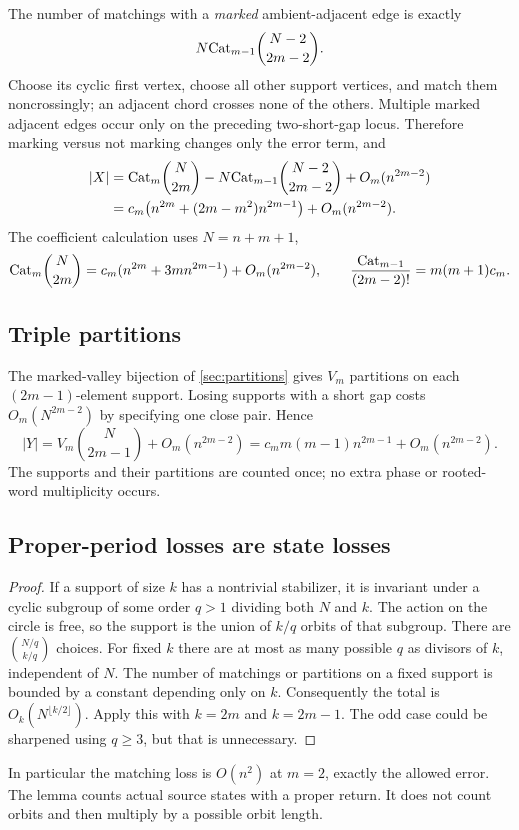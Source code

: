 The number of matchings with a \emph{marked} ambient-adjacent edge is exactly
\[
 N\mathrm{Cat}_{m-1}\binom{N-2}{2m-2}.
\]
Choose its cyclic first vertex, choose all other support vertices, and match them noncrossingly; an adjacent chord crosses none of the others. Multiple marked adjacent edges occur only on the preceding two-short-gap locus. Therefore marking versus not marking changes only the error term, and
\begin{align}
 |X|&=\mathrm{Cat}_m\binom N{2m}-N\mathrm{Cat}_{m-1}\binom{N-2}{2m-2}
       +O_m(n^{2m-2})\notag\\
 &=c_m\bigl(n^{2m}+(2m-m^2)n^{2m-1}\bigr)+O_m(n^{2m-2}).\label{eq:X-count}
\end{align}
The coefficient calculation uses $N=n+m+1$,
\[
 \mathrm{Cat}_m\binom N{2m}=c_m(n^{2m}+3mn^{2m-1})+O_m(n^{2m-2}),
 \qquad \frac{\mathrm{Cat}_{m-1}}{(2m-2)!}=m(m+1)c_m.
\]

\subsection{Triple partitions}
The marked-valley bijection of \cref{sec:partitions} gives $V_m$ partitions on each $(2m-1)$-element support. Losing supports with a short gap costs $O_m(N^{2m-2})$ by specifying one close pair. Hence
\begin{equation}\label{eq:Y-count}
 |Y|=V_m\binom N{2m-1}+O_m(n^{2m-2})
     =c_m m(m-1)n^{2m-1}+O_m(n^{2m-2}).
\end{equation}
The supports and their partitions are counted once; no extra phase or rooted-word multiplicity occurs.

\subsection{Proper-period losses are state losses}
\begin{proof}
If a support of size $k$ has a nontrivial stabilizer, it is invariant under a cyclic subgroup of some order $q>1$ dividing both $N$ and $k$. The action on the circle is free, so the support is the union of $k/q$ orbits of that subgroup. There are $\binom{N/q}{k/q}$ choices. For fixed $k$ there are at most as many possible $q$ as divisors of $k$, independent of $N$. The number of matchings or partitions on a fixed support is bounded by a constant depending only on $k$. Consequently the total is $O_k(N^{\lfloor k/2\rfloor})$. Apply this with $k=2m$ and $k=2m-1$. The odd case could be sharpened using $q\ge3$, but that is unnecessary.
\end{proof}
In particular the matching loss is $O(n^2)$ at $m=2$, exactly the allowed error. The lemma counts actual source states with a proper return. It does not count orbits and then multiply by a possible orbit length.

